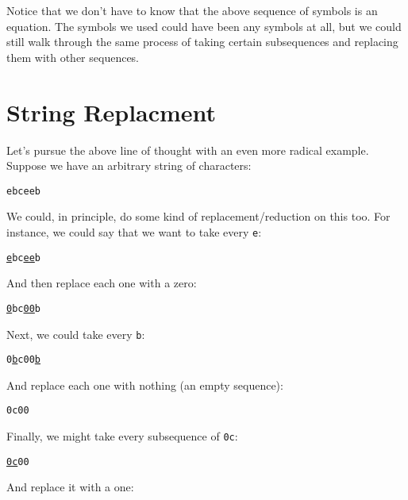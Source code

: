 \documentclass{book}
\numberwithin{equation}{chapter}
\begin{document}
\noindent
Notice that we don't have to know that the above sequence of symbols is an equation. The symbols we used could have been any symbols at all, but we could still walk through the same process of taking certain subsequences and replacing them with other sequences.


\section{String Replacment}

Let's pursue the above line of thought with an even more radical example. Suppose we have an arbitrary string of characters:

\begin{center}
\texttt{ebceeb}
\end{center}

\noindent
We could, in principle, do some kind of replacement/reduction on this too. For instance, we could say that we want to take every \texttt{e}:

\begin{center}
\texttt{\underline{e}bc\underline{ee}b}
\end{center}

\noindent
And then replace each one with a zero:

\begin{center}
\texttt{\underline{0}bc\underline{00}b}
\end{center}

\noindent
Next, we could take every \texttt{b}:

\begin{center}
\texttt{0\underline{b}c00\underline{b}}
\end{center}

\noindent
And replace each one with nothing (an empty sequence):

\begin{center}
\texttt{0c00}
\end{center}

\noindent
Finally, we might take every subsequence of \texttt{0c}:

\begin{center}
\texttt{\underline{0c}00}
\end{center}

\noindent
And replace it with a one:
\end{document}
